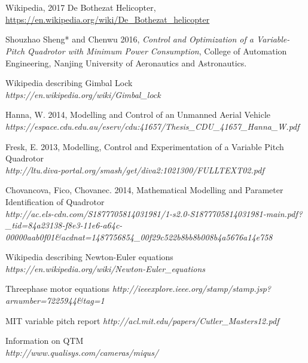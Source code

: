 \section *  {}

\begin{thebibliography}{9}

Wikipedia, 2017 De Bothezat Helicopter, 
\url{https://en.wikipedia.org/wiki/De_Bothezat_helicopter}


Shouzhao Sheng* and Chenwu 2016,      %
\textit{Control and Optimization of a Variable-Pitch
Quadrotor with Minimum Power Consumption},   %
College of Automation Engineering, Nanjing University of Aeronautics and Astronautics.
        
        Wikipedia describing Gimbal Lock \\ 
\textit{https://en.wikipedia.org/wiki/Gimbal{\_}lock}

        Hanna, W. 2014, Modelling and Control of an Unmanned Aerial Vehicle \\ 
\textit{https://espace.cdu.edu.au/eserv/cdu:41657/Thesis{\_}CDU{\_}41657{\_}Hanna{\_}W.pdf}

        Fresk, E. 2013, Modelling, Control and Experimentation of a Variable Pitch Quadrotor \\ 
\textit{http://ltu.diva-portal.org/smash/get/diva2:1021300/FULLTEXT02.pdf}

        Chovancova, Fico, Chovanec. 2014, Mathematical Modelling and Parameter Identification of Quadrotor \\ 
\textit{http://ac.els-cdn.com/S1877705814031981/1-s2.0-S1877705814031981-main.pdf?_tid=84a23138-f8e3-11e6-a64c-00000aab0f01&acdnat=1487756854{\_}00f29c522b8bb8b008b4a5676a14e758}

        Wikipedia describing Newton-Euler equations \\ 
\textit{https://en.wikipedia.org/wiki/Newton-Euler{\_}equations}

    Threephase motor equations
\textit{http://ieeexplore.ieee.org/stamp/stamp.jsp?arnumber=7225944&tag=1}

    MIT variable pitch report
\textit{http://acl.mit.edu/papers/Cutler_Masters12.pdf}

             Information on QTM \\ 
\textit{http://www.qualisys.com/cameras/miqus/}


\end{thebibliography}
